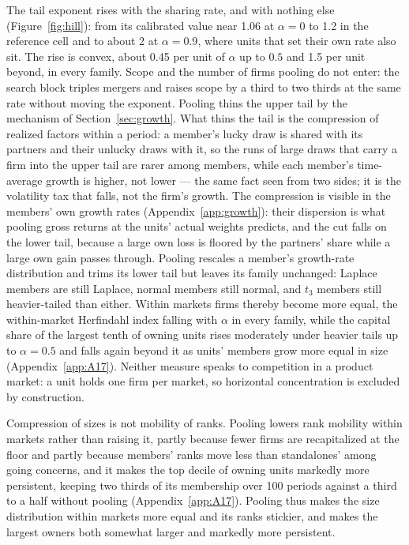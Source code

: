 The tail exponent rises with the sharing rate, and with nothing else (Figure~\ref{fig:hill}): from its calibrated value near 1.06 at $\alpha = 0$ to 1.2 in the reference cell and to about 2 at $\alpha = 0.9$, where units that set their own rate also sit. The rise is convex, about 0.45 per unit of $\alpha$ up to $0.5$ and 1.5 per unit beyond, in every family. Scope and the number of firms pooling do not enter: the search block triples mergers and raises scope by a third to two thirds at the same rate without moving the exponent. Pooling thins the upper tail by the mechanism of Section~\ref{sec:growth}. What thins the tail is the compression of realized factors within a period: a member's lucky draw is shared with its partners and their unlucky draws with it, so the runs of large draws that carry a firm into the upper tail are rarer among members, while each member's time-average growth is higher, not lower --- the same fact seen from two sides; it is the volatility tax that falls, not the firm's growth. The compression is visible in the members' own growth rates (Appendix~\ref{app:growth}): their dispersion is what pooling gross returns at the units' actual weights predicts, and the cut falls on the lower tail, because a large own loss is floored by the partners' share while a large own gain passes through. Pooling rescales a member's growth-rate distribution and trims its lower tail but leaves its family unchanged: Laplace members are still Laplace, normal members still normal, and $t_3$ members still heavier-tailed than either. Within markets firms thereby become more equal, the within-market Herfindahl index falling with $\alpha$ in every family, while the capital share of the largest tenth of owning units rises moderately under heavier tails up to $\alpha = 0.5$ and falls again beyond it as units' members grow more equal in size (Appendix~\ref{app:A17}). Neither measure speaks to competition in a product market: a unit holds one firm per market, so horizontal concentration is excluded by construction.

Compression of sizes is not mobility of ranks. Pooling lowers rank mobility within markets rather than raising it, partly because fewer firms are recapitalized at the floor and partly because members' ranks move less than standalones' among going concerns, and it makes the top decile of owning units markedly more persistent, keeping two thirds of its membership over 100 periods against a third to a half without pooling (Appendix~\ref{app:A17}). Pooling thus makes the size distribution within markets more equal and its ranks stickier, and makes the largest owners both somewhat larger and markedly more persistent.


